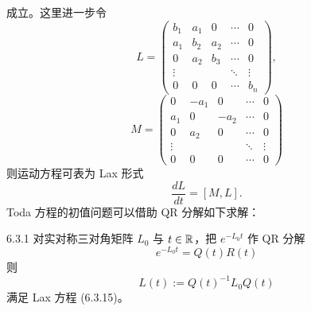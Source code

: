 成立。这里进一步令
\begin{equation}
  L=\begin{pmatrix}
    b_1 & a_1 & 0 & \cdots & 0\\
    a_1 & b_2 & a_2 & \cdots & 0\\
    0 & a_2 & b_3 & \cdots & 0\\
    \vdots & & & \ddots & \vdots\\
    0 & 0 & 0 & \cdots & b_n
  \end{pmatrix},
  \tag{6.3.13}
\end{equation}
\begin{equation}
  M=\begin{pmatrix}
    0 & -a_1 & 0 & \cdots & 0\\
    a_1 & 0 & -a_2 & \cdots & 0\\
    0 & a_2 & 0 & \cdots & 0\\
    \vdots & & & \ddots & \vdots\\
    0 & 0 & 0 & \cdots & 0
  \end{pmatrix}
  \tag{6.3.14}
\end{equation}
则运动方程可表为 Lax 形式
\begin{equation}
  \frac{dL}{dt}=[M,L].
  \tag{6.3.15}
\end{equation}
Toda 方程的初值问题可以借助 QR 分解如下求解：

\begin{theorem*}{6.3.1}
对实对称三对角矩阵 $L_0$ 与 $t\in\mathbb{R}$，把 $e^{-L_0t}$ 作 QR 分解
\begin{equation}
  e^{-L_0t}=Q(t)R(t)
  \tag{6.3.16}
\end{equation}
则
\begin{equation}
  L(t):=Q(t)^{-1}L_0Q(t)
  \tag{6.3.17}
\end{equation}
满足 Lax 方程 (6.3.15)。
\end{theorem*}

